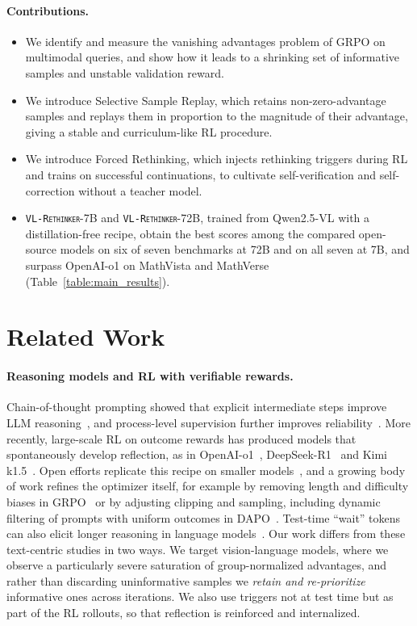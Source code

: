 \documentclass{article}
\newcommand{\model}{\texttt{\textsc{VL-Rethinker}}\xspace}
\begin{document}
\paragraph{Contributions.}
\begin{itemize}[leftmargin=*,itemsep=1pt,topsep=2pt]
\item We identify and measure the vanishing advantages problem of GRPO on multimodal queries, and show how it leads to a shrinking set of informative samples and unstable validation reward.
\item We introduce Selective Sample Replay, which retains non-zero-advantage samples and replays them in proportion to the magnitude of their advantage, giving a stable and curriculum-like RL procedure.
\item We introduce Forced Rethinking, which injects rethinking triggers during RL and trains on successful continuations, to cultivate self-verification and self-correction without a teacher model.
\item \model-7B and \model-72B, trained from Qwen2.5-VL with a distillation-free recipe, obtain the best scores among the compared open-source models on six of seven benchmarks at 72B and on all seven at 7B, and surpass OpenAI-o1 on MathVista and MathVerse (Table~\ref{table:main_results}).
\end{itemize}

\section{Related Work}

\paragraph{Reasoning models and RL with verifiable rewards.}
Chain-of-thought prompting showed that explicit intermediate steps improve LLM reasoning~\citep{wei2022chain}, and process-level supervision further improves reliability~\citep{letsverify}. More recently, large-scale RL on outcome rewards has produced models that spontaneously develop reflection, as in OpenAI-o1~\citep{openai-o1}, DeepSeek-R1~\citep{deepseek-r1} and Kimi k1.5~\citep{kimi-1_5}. Open efforts replicate this recipe on smaller models~\citep{simplerl,open-reasoner-zero,deepscaler2025,lightr1}, and a growing body of work refines the optimizer itself, for example by removing length and difficulty biases in GRPO~\citep{drgrpo} or by adjusting clipping and sampling, including dynamic filtering of prompts with uniform outcomes in DAPO~\citep{dapo}. Test-time ``wait'' tokens can also elicit longer reasoning in language models~\citep{s1}. Our work differs from these text-centric studies in two ways. We target vision-language models, where we observe a particularly severe saturation of group-normalized advantages, and rather than discarding uninformative samples we \emph{retain and re-prioritize} informative ones across iterations. We also use triggers not at test time but as part of the RL rollouts, so that reflection is reinforced and internalized.
\end{document}
